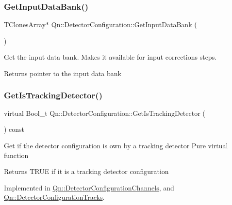 \subsubsection{\texorpdfstring{Get\+Input\+Data\+Bank()}{GetInputDataBank()}}
{\footnotesize\ttfamily T\+Clones\+Array$\ast$ Qn\+::\+Detector\+Configuration\+::\+Get\+Input\+Data\+Bank (\begin{DoxyParamCaption}{ }\end{DoxyParamCaption})\hspace{0.3cm}{\ttfamily [inline]}}

Get the input data bank. Makes it available for input corrections steps. \begin{DoxyReturn}{Returns}
pointer to the input data bank 
\end{DoxyReturn}
\mbox{\label{classQn_1_1DetectorConfiguration_acdb57db96ed24524b5a3a28821727a3d}} 
\subsubsection{\texorpdfstring{Get\+Is\+Tracking\+Detector()}{GetIsTrackingDetector()}}
{\footnotesize\ttfamily virtual Bool\+\_\+t Qn\+::\+Detector\+Configuration\+::\+Get\+Is\+Tracking\+Detector (\begin{DoxyParamCaption}{ }\end{DoxyParamCaption}) const\hspace{0.3cm}{\ttfamily [pure virtual]}}

Get if the detector configuration is own by a tracking detector Pure virtual function \begin{DoxyReturn}{Returns}
T\+R\+UE if it is a tracking detector configuration 
\end{DoxyReturn}


Implemented in \mbox{\hyperlink{classQn_1_1DetectorConfigurationChannels_a24728cc5b3b9f80f9965268d1153f06c}{Qn\+::\+Detector\+Configuration\+Channels}}, and \mbox{\hyperlink{classQn_1_1DetectorConfigurationTracks_ac9b06051e9ec37086f071308e5031b62}{Qn\+::\+Detector\+Configuration\+Tracks}}.

\mbox{\label{classQn_1_1DetectorConfiguration_a88f8b14da5e8faa8fd2548c6ab06f68a}} 

